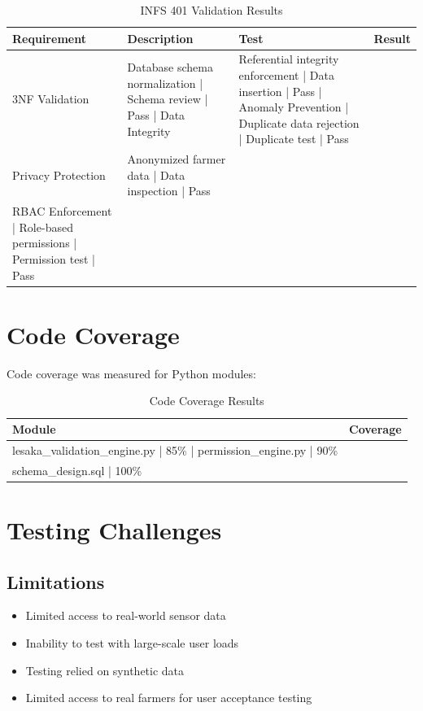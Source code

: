 \begin{table}[H]
\centering
\begin{tabular}{|l|l|l|l|}
\hline
\textbf{Requirement} & \textbf{Description} & \textbf{Test} & \textbf{Result} \\
\hline
3NF Validation & Database schema normalization | Schema review | Pass |
Data Integrity & Referential integrity enforcement | Data insertion | Pass |
Anomaly Prevention | Duplicate data rejection | Duplicate test | Pass \\
Privacy Protection & Anonymized farmer data | Data inspection | Pass \\
RBAC Enforcement | Role-based permissions | Permission test | Pass \\
\hline
\end{tabular}
\caption{INFS 401 Validation Results}
\end{table}

\section{Code Coverage}

Code coverage was measured for Python modules:

\begin{table}[H]
\centering
\begin{tabular}{|l|l|}
\hline
\textbf{Module} & \textbf{Coverage} \\
\hline
lesaka\_validation\_engine.py | 85\% |
permission\_engine.py | 90\% \\
schema\_design.sql | 100\% \\
\hline
\end{tabular}
\caption{Code Coverage Results}
\end{table}

\section{Testing Challenges}

\subsection{Limitations}

\begin{itemize}
    \item Limited access to real-world sensor data
    \item Inability to test with large-scale user loads
    \item Testing relied on synthetic data
    \item Limited access to real farmers for user acceptance testing
\end{itemize}

